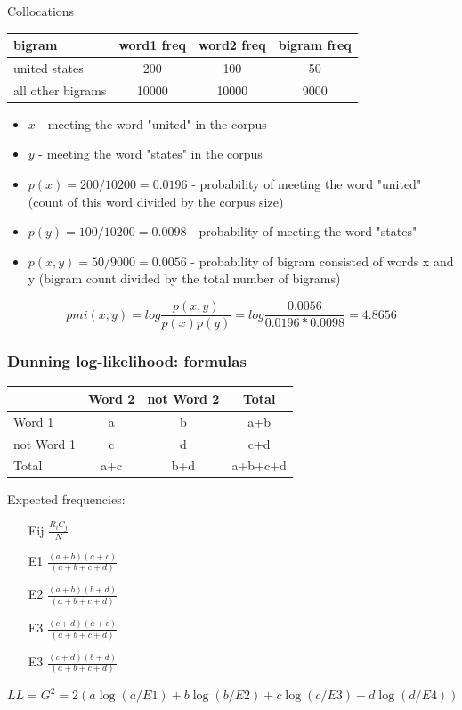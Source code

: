 \documentclass[svgnames]{beamer}
\begin{document}
\begin{frame}{Collocations}
  \begin{tabular}[l]{lccc}
    bigram & word1 freq & word2 freq & bigram freq \\
    \hline
    united states & 200 & 100 & 50\\
    all other bigrams & 10000 & 10000 & 9000\\
  \end{tabular}
    \begin{itemize}
  \item $x$ - meeting the word "united" in the corpus
  \item $y$ - meeting the word "states" in the corpus
  \item $p(x)=200/10200 = 0.0196$ - probability of meeting the word "united" (count of this word divided by the corpus size)
  \item $p(y) = 100/10200=0.0098$ - probability of meeting the word "states"
      \item $p(x, y) = 50/9000=0.0056$ - probability of bigram consisted of words x and y (bigram count divided by the total number of bigrams)
    \end{itemize}

  $$pmi(x;y) = log \frac{p(x,y)}{p(x)p(y)} = log \frac{0.0056}{0.0196 * 0.0098} = 4.8656$$

\end{frame}

\begin{frame}
  \frametitle{Dunning log-likelihood: formulas}
  \begin{tabular}[c]{|p{}|c|c|c|}
    \hline
   & Word 2 & not Word 2 & Total \\
    \hline
    Word 1 & a & b & a+b \\
    \hline
    not Word 1 & c & d & c+d \\
    \hline
    Total & a+c & b+d & a+b+c+d \\
    \hline
  \end{tabular}

\bigskip
  Expected frequencies:
  \begin{itemize}
  \item[Eij] $\frac{R_iC_j}{N}$
  \item[E1] $\frac{(a+b)(a+c)}{(a+b+c+d)}$
  \item[E2] $\frac{(a+b)(b+d)}{(a+b+c+d)}$
  \item[E3] $\frac{(c+d)(a+c)}{(a+b+c+d)}$
  \item[E3] $\frac{(c+d)(b+d)}{(a+b+c+d)}$
  \end{itemize}

    $LL = G^2 = 2 (a \log (a/E1) + b \log (b/E2) +c \log(c/E3) + d \log(d/E4))$

\end{frame}
\end{document}

